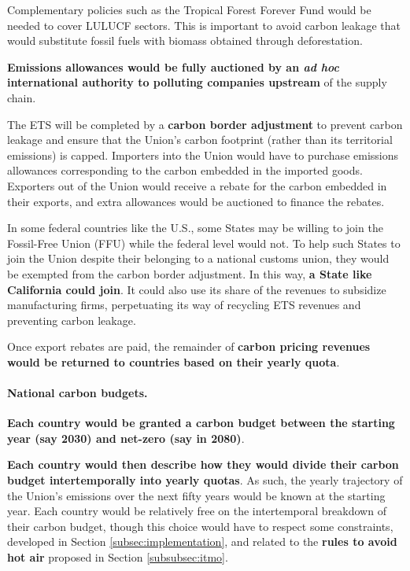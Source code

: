 \documentclass[12pt,english]{article}
\begin{document}
Complementary policies such as the Tropical Forest Forever Fund would be needed to cover LULUCF sectors. This is important to avoid carbon leakage that would substitute fossil fuels with biomass obtained through deforestation.\cite{aggarwal_negative_2025} %

\textbf{Emissions allowances would be fully auctioned by an \textit{ad hoc} international authority to polluting companies upstream} of the supply chain. 

The ETS will be completed by a \textbf{carbon border adjustment} to prevent carbon leakage and ensure that the Union's carbon footprint (rather than its territorial emissions) is capped. Importers into the Union would have to purchase emissions allowances corresponding to the carbon embedded in the imported goods. Exporters out of the Union would receive a rebate for the carbon embedded in their exports, and extra allowances would be auctioned to finance the rebates. 

In some federal countries like the U.S., some States may be willing to join the Fossil-Free Union (FFU) while the federal level would not. To help such States to join the Union despite their belonging to a national customs union, they would be exempted from the carbon border adjustment. %
In this way, \textbf{a State like California could join}. It could also use its share of the revenues to subsidize manufacturing firms, perpetuating its way of recycling ETS revenues and preventing carbon leakage.

Once export rebates are paid, the remainder of \textbf{carbon pricing revenues would be returned to countries based on their yearly quota}.

\paragraph{National carbon budgets.}
\textbf{Each country would be granted a carbon budget between the starting year (say 2030) and net-zero (say in 2080)}. 

\textbf{Each country would then describe how they would divide their carbon budget intertemporally into yearly quotas}. As such, the yearly trajectory of the Union's emissions over the next fifty years would be known at the starting year. Each country would be relatively free on the intertemporal breakdown of their carbon budget, though this choice would have to respect some constraints, developed in Section \ref{subsec:implementation}, and related to the \textbf{rules to avoid hot air} proposed in Section \ref{subsubsec:itmo}.
\end{document}
